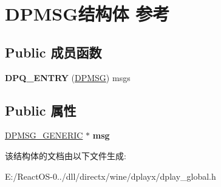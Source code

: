 \hypertarget{struct_d_p_m_s_g}{}\section{D\+P\+M\+S\+G结构体 参考}
\label{struct_d_p_m_s_g}
\subsection*{Public 成员函数}
\begin{DoxyCompactItemize}
\item 
\mbox{\label{struct_d_p_m_s_g_a885251c5210c95eab010e830c06bcc23}} 
{\bfseries D\+P\+Q\+\_\+\+E\+N\+T\+RY} (\hyperlink{struct_d_p_m_s_g}{D\+P\+M\+SG}) msgs
\end{DoxyCompactItemize}
\subsection*{Public 属性}
\begin{DoxyCompactItemize}
\item 
\mbox{\label{struct_d_p_m_s_g_a6b4c9aa14138bd94fde873eef846d5a5}} 
\hyperlink{structtag_d_p_m_s_g___g_e_n_e_r_i_c}{D\+P\+M\+S\+G\+\_\+\+G\+E\+N\+E\+R\+IC} $\ast$ {\bfseries msg}
\end{DoxyCompactItemize}


该结构体的文档由以下文件生成\+:\begin{DoxyCompactItemize}
\item 
E\+:/\+React\+O\+S-\/0../dll/directx/wine/dplayx/dplay\+\_\+global.\+h\end{DoxyCompactItemize}
